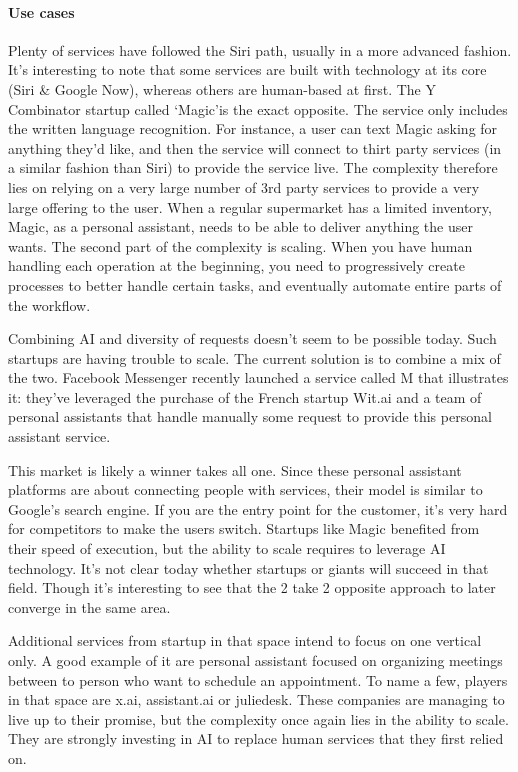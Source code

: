 \documentclass[12pt]{article}
\begin{document}
\paragraph{Use cases}

Plenty of services have followed the Siri path, usually in a more advanced
fashion. It's interesting to note that some services are built with technology
at its core (Siri \& Google Now), whereas others are human-based at first. The Y
Combinator startup called \lq Magic\rq  is the exact opposite. The service only
includes the written language recognition. For instance, a user can text Magic
asking for anything they'd like, and then the service will connect to thirt
party services (in a similar fashion than Siri) to provide the service live. The
complexity therefore lies on relying on a very large number of 3rd party
services to provide a very large offering to the user. When a regular supermarket
has a limited inventory, Magic, as a personal assistant, needs to be able to
deliver anything the user wants. The second part of the complexity is scaling.
When you have human handling each operation at the beginning, you need to
progressively create processes to better handle certain tasks, and eventually
automate entire parts of the workflow.

Combining AI and diversity of requests doesn't seem to be possible today. Such
startups are having trouble to scale. The current solution is to combine a mix
of the two. Facebook Messenger recently launched a service called M that
illustrates it: they've leveraged the purchase of the French startup Wit.ai and
a team of personal assistants that handle manually some request to provide this
personal assistant service.

This market is likely a winner takes all one. Since these personal assistant
platforms are about connecting people with services, their model is similar to
Google's search engine. If you are the entry point for the customer, it's very
hard for competitors to make the users switch. Startups like Magic benefited
from their speed of execution, but the ability to scale requires to leverage AI
technology. It's not clear today whether startups or giants will succeed in that
field. Though it's interesting to see that the 2 take 2 opposite approach to
later converge in the same area.

Additional services from startup in that space intend to focus on one vertical
only. A good example of it are personal assistant focused on organizing meetings
between to person who want to schedule an appointment. To name a few, players in
that space are x.ai, assistant.ai or juliedesk. These companies are managing to
live up to their promise, but the complexity once again lies in the ability to
scale. They are strongly investing in AI to replace human services that they
first relied on.
\end{document}
